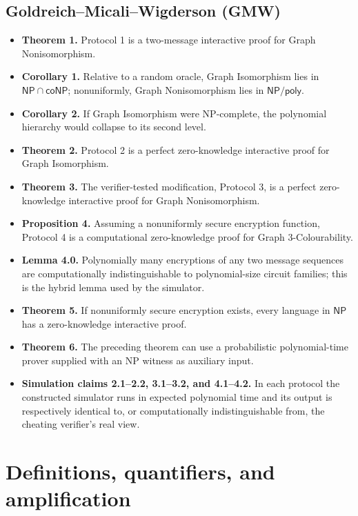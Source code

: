 \documentclass[10pt]{article}
\newcommand{\NP}{\mathsf{NP}}
\newcommand{\coNP}{\mathsf{coNP}}
\begin{document}
\subsection*{Goldreich--Micali--Wigderson (GMW)}
\begin{itemize}
\item \textbf{Theorem 1.} Protocol 1 is a two-message interactive proof for
Graph Nonisomorphism.
\item \textbf{Corollary 1.} Relative to a random oracle, Graph Isomorphism lies
in $\NP\cap\coNP$; nonuniformly, Graph Nonisomorphism lies in
$\NP/\mathsf{poly}$.
\item \textbf{Corollary 2.} If Graph Isomorphism were NP-complete, the
polynomial hierarchy would collapse to its second level.
\item \textbf{Theorem 2.} Protocol 2 is a perfect zero-knowledge interactive
proof for Graph Isomorphism.
\item \textbf{Theorem 3.} The verifier-tested modification, Protocol 3, is a
perfect zero-knowledge interactive proof for Graph Nonisomorphism.
\item \textbf{Proposition 4.} Assuming a nonuniformly secure encryption
function, Protocol 4 is a computational zero-knowledge proof for Graph
$3$-Colourability.
\item \textbf{Lemma 4.0.} Polynomially many encryptions of any two message
sequences are computationally indistinguishable to polynomial-size circuit
families; this is the hybrid lemma used by the simulator.
\item \textbf{Theorem 5.} If nonuniformly secure encryption exists, every
language in $\NP$ has a zero-knowledge interactive proof.
\item \textbf{Theorem 6.} The preceding theorem can use a probabilistic
polynomial-time prover supplied with an NP witness as auxiliary input.
\item \textbf{Simulation claims 2.1--2.2, 3.1--3.2, and 4.1--4.2.} In each
protocol the constructed simulator runs in expected polynomial time and its
output is respectively identical to, or computationally indistinguishable from,
the cheating verifier's real view.
\end{itemize}

\endgroup

\section{Definitions, quantifiers, and amplification}
\end{document}
